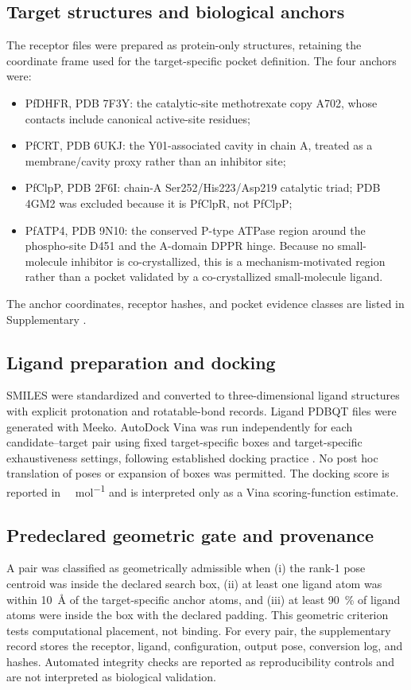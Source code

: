 \documentclass[journal=jcisd8,manuscript=article]{achemso}
\begin{document}
\subsection{Target structures and biological anchors}
The receptor files were prepared as protein-only structures, retaining the coordinate frame used for the target-specific pocket definition. The four anchors were:
\begin{itemize}
\item PfDHFR, PDB 7F3Y: the catalytic-site methotrexate copy A702, whose contacts include canonical active-site residues;
\item PfCRT, PDB 6UKJ: the Y01-associated cavity in chain A, treated as a membrane/cavity proxy rather than an inhibitor site;
\item PfClpP, PDB 2F6I: chain-A Ser252/His223/Asp219 catalytic triad; PDB 4GM2 was excluded because it is PfClpR, not PfClpP;
\item PfATP4, PDB 9N10: the conserved P-type ATPase region around the phospho-site D451 and the A-domain DPPR hinge. Because no small-molecule inhibitor is co-crystallized, this is a mechanism-motivated region rather than a pocket validated by a co-crystallized small-molecule ligand.
\end{itemize}
The anchor coordinates, receptor hashes, and pocket evidence classes are listed in Supplementary .

\subsection{Ligand preparation and docking}
SMILES were standardized and converted to three-dimensional ligand structures with explicit protonation and rotatable-bond records. Ligand PDBQT files were generated with Meeko. AutoDock Vina was run independently for each candidate--target pair using fixed target-specific boxes and target-specific exhaustiveness settings, following established docking practice \cite{Trott2009,Eberhardt2021}. No post hoc translation of poses or expansion of boxes was permitted. The docking score is reported in \si{\kilo\calorie\per\mole} and is interpreted only as a Vina scoring-function estimate.

\subsection{Predeclared geometric gate and provenance}
A pair was classified as geometrically admissible when (i) the rank-1 pose centroid was inside the declared search box, (ii) at least one ligand atom was within \qty{10}{\angstrom} of the target-specific anchor atoms, and (iii) at least \qty{90}{\percent} of ligand atoms were inside the box with the declared padding. This geometric criterion tests computational placement, not binding. For every pair, the supplementary record stores the receptor, ligand, configuration, output pose, conversion log, and hashes. Automated integrity checks are reported as reproducibility controls and are not interpreted as biological validation.
\end{document}
